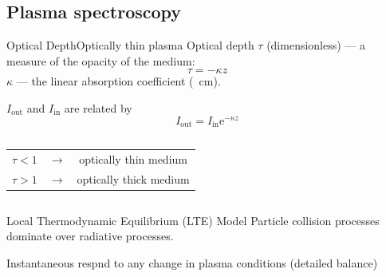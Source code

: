 \documentclass[]{beamer}
\begin{document}
\subsection{Plasma spectroscopy}
\begin{frame}{Optical Depth}{Optically thin plasma}
  Optical depth $\tau$ \small{(dimensionless)} --- a measure of the opacity of the medium:
  \begin{equation*}
    \tau=-\kappa z
  \end{equation*}
  $\kappa$ --- the linear absorption coefficient (\si{\per\cm}).

  $I_\text{out}$ and $I_\text{in}$ are related by
  \begin{equation*}
    I_\text{out} = I_\text{in}\mathrm{e}^{-\kappa z} %
  \end{equation*}
\begin{columns}
      
  \begin{center}
  \begin{tabular}{ c c c }
    $\tau<1$ & $\longrightarrow$ & optically thin medium\\ 
    $\tau>1$ & $\longrightarrow$ & optically thick medium
  \end{tabular}
  \end{center}
\end{columns}
\end{frame}
\begin{frame}{Local Thermodynamic Equilibrium (LTE) Model}
  Particle collision processes dominate over radiative processes.


  Instantaneous respnd to any change in plasma conditions (detailed balance)
\end{frame}
\end{document}
